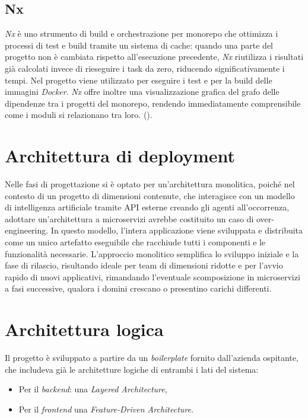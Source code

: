 \subsection{Nx}
\emph{Nx} è uno strumento di build e orchestrazione per monorepo che ottimizza i processi di test e build tramite un sistema di cache: quando una parte del progetto non è cambiata rispetto all'esecuzione precedente, \emph{Nx} riutilizza i risultati già calcolati invece di rieseguire i task da zero, riducendo significativamente i tempi. Nel progetto viene utilizzato per eseguire i test e per la build delle immagini \emph{Docker}. \emph{Nx} offre inoltre una visualizzazione grafica del grafo delle dipendenze tra i progetti del monorepo, rendendo immediatamente comprensibile come i moduli si relazionano tra loro. (\cite{site:nx}).

\section{Architettura di deployment}
Nelle fasi di progettazione si è optato per un'architettura monolitica, poiché nel contesto di un progetto di dimensioni contenute, che interagisce con un modello di intelligenza artificiale tramite API esterne creando gli agenti all'occorrenza, adottare un'architettura a microservizi avrebbe costituito un caso di over-engineering. In questo modello, l'intera applicazione viene sviluppata e distribuita come un unico artefatto eseguibile che racchiude tutti i componenti e le funzionalità necessarie. L'approccio monolitico semplifica lo sviluppo iniziale e la fase di rilascio, risultando ideale per team di dimensioni ridotte e per l'avvio rapido di nuovi applicativi, rimandando l'eventuale scomposizione in microservizi a fasi successive, qualora i domini crescano o presentino carichi differenti.

\section{Architettura logica}
Il progetto è sviluppato a partire da un \emph{boilerplate} fornito dall'azienda ospitante, che includeva già le architetture logiche di entrambi i lati del sistema: 
\begin{itemize}
    \item Per il \emph{backend}: una \emph{Layered Architecture}, 
    \item Per il \emph{frontend} una \emph{Feature-Driven Architecture}.
\end{itemize}

